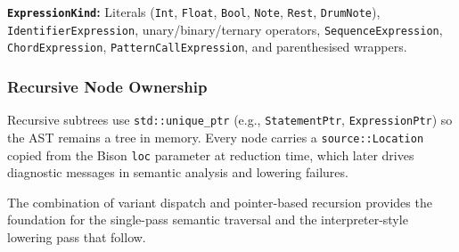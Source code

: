\noindent \textbf{\texttt{ExpressionKind}:} Literals (\texttt{Int}, \texttt{Float}, \texttt{Bool}, \texttt{Note},
\texttt{Rest}, \texttt{DrumNote}), \texttt{IdentifierExpression}, unary/binary/ternary operators,
\texttt{SequenceExpression}, \texttt{ChordExpression}, \texttt{PatternCallExpression}, and parenthesised wrappers.

\subsubsection{Recursive Node Ownership}

Recursive subtrees use \texttt{std::unique\_ptr} (e.g., \texttt{StatementPtr}, \texttt{ExpressionPtr}) so the AST
remains a tree in memory.
Every node carries a \texttt{source::Location} copied from the Bison \texttt{loc} parameter at reduction time, which
later drives diagnostic messages in semantic analysis and lowering failures.

The combination of variant dispatch and pointer-based recursion provides the foundation for the single-pass semantic
traversal and the interpreter-style lowering pass that follow.

